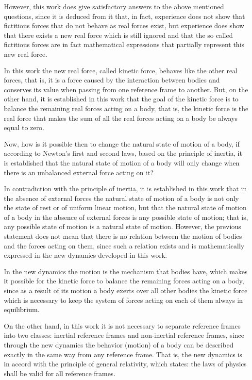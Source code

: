 \documentclass[12pt]{article}
\begin{document}
\par However, this work does give satisfactory answers to the above mentioned questions, since it is deduced from it that, in fact, experience does not show that fictitious forces that do not behave as real forces exist, but experience does show that there exists a new real force which is still ignored and that the so called fictitious forces are in fact mathematical expressions that partially represent this new real force.
\par In this work the new real force, called kinetic force, behaves like the other real forces, that is, it is a force caused by the interaction between bodies and conserves its value when passing from one reference frame to another. But, on the other hand, it is established in this work that the goal of the kinetic force is to balance the remaining real forces acting on a body, that is, the kinetic force is the real force that makes the sum of all the real forces acting on a body be always equal to zero.
\par Now, how is it possible then to change the natural state of motion of a body, if according to Newton's first and second laws, based on the principle of inertia, it is established that the natural state of motion of a body will only change when there is an unbalanced external force acting on it?
\par In contradiction with the principle of inertia, it is established in this work that in the absence of external forces the natural state of motion of a body is not only the state of rest or of uniform linear motion, but that the natural state of motion of a body in the absence of external forces is any possible state of motion; that is, any possible state of motion is a natural state of motion. However, the previous statement does not mean that there is no relation between the motion of bodies and the forces acting on them, since such a relation exists and is mathematically expressed in the new dynamics developed in this work.
\par In the new dynamics the motion is the mechanism that bodies have, which makes it possible for the kinetic force to balance the remaining forces acting on a body, since as a result of its motion a body exerts over all other bodies the kinetic force which is necessary to keep the system of forces acting on each of them always in equilibrium.
\par On the other hand, in this work it is not necessary to separate reference frames into two classes: inertial reference frames and non-inertial reference frames, since through the new dynamics the behavior (motion) of a body can be described exactly in the same way from any reference frame. That is, the new dynamics is in accord with the principle of general relativity, which states: the laws of physics shall be valid for all reference frames.
\end{document}
